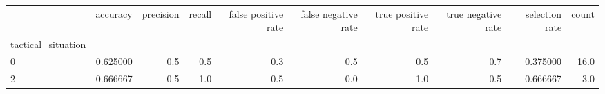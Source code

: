 \begin{tabular}{lrrrrrrrrr}
\toprule
{} &  accuracy &  precision &  recall &  false positive rate &  false negative rate &  true positive rate &  true negative rate &  selection rate &  count \\
tactical\_situation &           &            &         &                      &                      &                     &                     &                 &        \\
\midrule
0                  &  0.625000 &        0.5 &     0.5 &                  0.3 &                  0.5 &                 0.5 &                 0.7 &        0.375000 &   16.0 \\
2                  &  0.666667 &        0.5 &     1.0 &                  0.5 &                  0.0 &                 1.0 &                 0.5 &        0.666667 &    3.0 \\
\bottomrule
\end{tabular}
